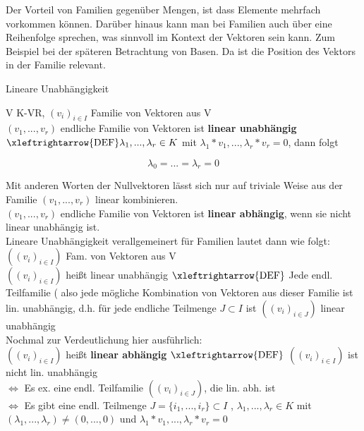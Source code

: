 \documentclass[headsepline,12pt,a4paper]{scrartcl}
\begin{document}
Der Vorteil von Familien gegenüber Mengen, ist dass Elemente mehrfach vorkommen können. Darüber hinaus kann man bei Familien auch über eine Reihenfolge sprechen, was sinnvoll im Kontext der Vektoren sein kann. Zum Beispiel bei der späteren Betrachtung von Basen. Da ist die Position des Vektors in der Familie relevant. \\

\newpage

\begin{center}
\item[Lineare Unabhängigkeit]
\end{center}

V K-VR, $(v_i)_{i \in I}$ Familie von Vektoren aus V \\
$(v_1,...,v_r)$ endliche Familie von Vektoren ist \textbf{linear unabhängig} $ \xleftrightarrow{\text{DEF}} \lambda_1,..., \lambda_r \in K $ mit $ \lambda_1 * v_1 ,..., \lambda_r * v_r = 0 $, dann folgt 

$$ \lambda_0 = ... = \lambda_r = 0 $$

Mit anderen Worten der Nullvektoren lässt sich nur auf triviale Weise aus der Familie $(v_1,...,v_r)$ linear kombinieren. \\
$(v_1,...,v_r)$ endliche Familie von Vektoren ist \textbf{linear abhängig}, wenn sie nicht linear unabhängig ist. \\

Lineare Unabhängigkeit verallgemeinert für Familien lautet dann wie folgt: \\
$((v_i)_{i \in I}) $ Fam. von Vektoren aus V \\
$((v_i)_{i \in I})$ heißt linear unabhängig $ \xleftrightarrow{\text{DEF}} $ Jede endl. Teilfamilie ( also jede mögliche Kombination von Vektoren aus dieser Familie ist lin. unabhängig, d.h. für jede endliche Teilmenge $J \subset I $ ist $((v_i)_{i \in J})$ linear unabhängig \\

Nochmal zur Verdeutlichung hier ausführlich: \\
$((v_i)_{i \in I})$ heißt \textbf{linear abhängig} $ \xleftrightarrow{\text{DEF}} $ $((v_i)_{i \in I})$ ist nicht lin. unabhängig \\

$ \Leftrightarrow $ Es ex. eine endl. Teilfamilie $((v_i)_{i \in J})$, die lin. abh. ist  \\

$ \Leftrightarrow $ Es gibt eine endl. Teilmenge $J=\{i_1,...,i_r\} \subset I $ , $ \lambda_1,..., \lambda_r \in K $ mit \\
$ ( \lambda_1,..., \lambda_r ) \neq (0,...,0) $ und $ \lambda_1 * v_1 ,..., \lambda_r * v_r = 0 $ \\
\end{document}
